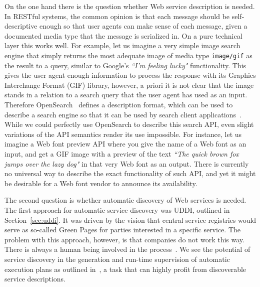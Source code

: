 \documentclass[smallextended]{svjour3}
\begin{document}
{On the one hand there is the question whether Web service description is needed. In RESTful systems, the common opinion is that each message should be self-descriptive enough so that user agents can make sense of each message, given a documented media type that the message is serialized in. On a pure technical layer this works well. For example, let us imagine a very simple image search engine that simply returns the most adequate image of media type \Verb!image/gif! as the result to a query, similar to Google's \emph{``I'm feeling lucky"} functionality. This gives the user agent enough information to process the response with its Graphics Interchange Format (GIF) library, however, a priori it is not clear that the image stands in a relation to a search query that the user agent has used as an input. Therefore OpenSearch~\cite{OpenSearch} defines a description format, which can be used to describe a search engine so that it can be used by search client applications~\cite{Klyuev,Pyshkin}. While we could perfectly use OpenSearch to describe this search API, even slight variations of the API semantics render its use impossible. For instance, let us imagine a Web font preview API where you give the name of a Web font as an input, and get a GIF image with a preview of the text \emph{``The quick brown fox jumps over the lazy dog"} in that very Web font as an output. There is currently no universal way to describe the exact functionality of such API, and yet it might be desirable for a Web font vendor to announce its availability. 

The second question is whether automatic discovery of Web services is needed. The first approach for automatic service discovery was UDDI, outlined in Section~\ref{sec:uddi}. It was driven by the vision that central service registries would serve as so-called Green Pages for parties interested in a specific service. The problem with this approach, however, is that companies do not work this way. There is always a human being involved in the process~\cite{UDDIDiscontinue}. We see the potential of service discovery in the generation and run-time supervision of automatic execution plans as outlined in~\cite{Verborgh:2011p4792}, a task that can highly profit from discoverable service descriptions.

}
\end{document}
